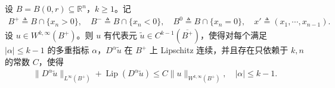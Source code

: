 \documentclass[../../main.tex]{subfiles}
\begin{document}
\begin{lemma}\label{lemma:ch05-Wkinfty代表元}
设 $B=B(0,r)\subseteq\mathbb{R}^{n}$，$k\geqslant1$。记
\begin{align*}
B^{+}\triangleq B\cap\{x_n>0\},\quad
B^{-}\triangleq B\cap\{x_n<0\},\quad
B^{0}\triangleq B\cap\{x_n=0\},\quad
x'\triangleq(x_1,\cdots,x_{n-1}).
\end{align*}
设 $u\in W^{k,\infty}(B^{+})$。则 $u$ 有代表元 $\widetilde{u}\in C^{k-1}(\overline{B^{+}})$，使得对每个满足 $|\alpha|\leqslant k-1$ 的多重指标 $\alpha$，$D^{\alpha}\widetilde{u}$ 在 $B^{+}$ 上 Lipschitz 连续，并且存在只依赖于 $k,n$ 的常数 $C$，使得
\begin{align}
\|D^{\alpha}\widetilde{u}\|_{L^{\infty}(B^{+})}
+\operatorname{Lip}(D^{\alpha}\widetilde{u})
\leqslant C\|u\|_{W^{k,\infty}(B^{+})},\quad |\alpha|\leqslant k-1.
\label{eq:ch05-Wkinfty代表元估计}
\end{align}
\end{lemma}
\end{document}
